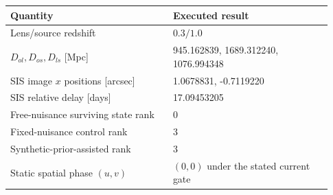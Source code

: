 \begin{tabular}{p{0.47\linewidth}p{0.46\linewidth}}
\toprule
Quantity & Executed result \\
\midrule
Lens/source redshift & $0.3 / 1.0$ \\
$D_{ol},D_{os},D_{ls}$ [Mpc] & 945.162839, 1689.312240, 1076.994348 \\
SIS image $x$ positions [arcsec] & 1.0678831, -0.7119220 \\
SIS relative delay [days] & 17.09453205 \\
Free-nuisance surviving state rank & 0 \\
Fixed-nuisance control rank & 3 \\
Synthetic-prior-assisted rank & 3 \\
Static spatial phase $(u,v)$ & $ (0,0)$ under the stated current gate \\
\bottomrule
\end{tabular}
